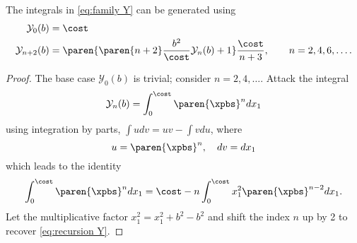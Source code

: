 \begin{myTheorem}[Recursion]
The integrals in \eqref{eq:family Y} can be generated using
\begin{equation}
  \begin{split}
    \mathcal{Y}_{0}(b)   &= \cost \\
    \mathcal{Y}_{n+2}(b) &= \paren{\paren{n + 2} \frac{b^{2}}{\cost} \mathcal{Y}_{n}(b) + 1} \frac{\cost}{n + 3}, \qquad n = 2, 4, 6, \dots.
  \end{split}
\label{eq:recursion Y}
\end{equation}
\end{myTheorem}  %
\begin{proof}  %
The base case $\mathcal{Y}_{0}(b)$ is trivial; consider $n=2,4,\dots$. Attack the integral
  \begin{equation}
    \mathcal{Y}_{n}(b) = \int_{0}^{\cost} \paren{ \xpbs }^{n} dx_{1}
  \end{equation}
using integration by parts, $\int udv = uv - \int vdu$, where 
  \begin{equation}
    u = \paren{ \xpbs }^{n}, \quad dv = dx_{1}
  \end{equation}
which leads to the identity
  \begin{equation}
    \int_{0}^{\cost} \paren{ \xpbs }^{n} dx_{1} = \cost - n 
    \int_{0}^{\cost} x_{1}^{2} \paren{ \xpbs }^{n-2} dx_{1}.
  \end{equation}
Let the multiplicative factor $x_{1}^{2} = x_{1}^{2} + b^{2} - b^{2}$ and shift the index $n$ up by 2 to recover \eqref{eq:recursion Y}.
\end{proof}

\endinput %